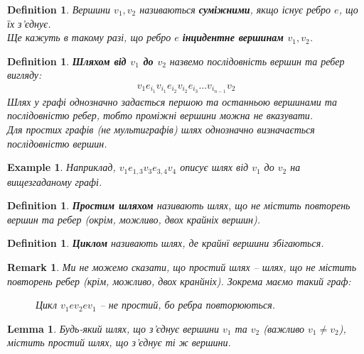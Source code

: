 \documentclass[a4paper, 14pt]{extarticle}
\theoremstyle{theoremdd}
\theoremstyle{theoremdd}
\newtheorem{definition}[theorem]{Definition}
\theoremstyle{theoremdd}
\theoremstyle{theoremdd}
\theoremstyle{theoremdd}
\newtheorem{example}[theorem]{Example}
\theoremstyle{theoremdd}
\theoremstyle{theoremdd}
\theoremstyle{theoremdd}
\theoremstyle{theoremdd}
\theoremstyle{theoremdd}
\theoremstyle{theoremdd}
\newtheorem{remark}[theorem]{Remark}
\theoremstyle{theoremdd}
\theoremstyle{theoremdd}
\newtheorem{lemma}[theorem]{Lemma}
\theoremstyle{theoremdd}
\theoremstyle{theoremdd}
\begin{document}
\begin{definition}
Вершини $v_1,v_2$ називаються \textbf{суміжними}, якщо існує ребро $e$, що їх з'єднує.\\
Ще кажуть в такому разі, що ребро $e$ \textbf{інцидентне вершинам $v_1,v_2$}. 
\end{definition}

\begin{definition}
\textbf{Шляхом від $v_1$ до $v_2$} назвемо послідовність вершин та ребер вигляду:
\begin{align*}
v_1 e_{i_1} v_{i_1} e_{i_2} v_{i_2} e_{i_3} \dots v_{i_{n-1}} v_2
\end{align*}
Шлях у графі однозначно задається першою та останньою вершинами та послідовністю ребер, тобто проміжні вершини можна не вказувати.\\
Для простих графів (не мультиграфів) шлях однозначно визначається послідовністю вершин.
\end{definition}

\begin{example}
Наприклад, $v_1 e_{1,3} v_3 e_{3,4} v_4$ описує шлях від $v_1$ до $v_2$ на вищезгаданому графі.
\end{example}

\begin{definition}
\textbf{Простим шляхом} називають шлях, що не містить повторень вершин та ребер (окрім, можливо, двох крайніх вершин).
\end{definition}

\begin{definition}
\textbf{Циклом} називають шлях, де крайнї вершини збігаються.
\end{definition}

\begin{remark}
Ми не можемо сказати, що простий шлях -- шлях, що не містить повторень ребер (крім, можливо, двох кранйніх). Зокрема маємо такий граф:
\begin{figure}[H]
\centering
{}
\caption*{Цикл $v_1ev_2ev_1$ -- не простий, бо ребра повторюються.}
\end{figure}
\end{remark}

\begin{lemma}
Будь-який шлях, що з'єднує вершини $v_1$ та $v_2$ (важливо $v_1 \neq v_2$), містить простий шлях, що з'єднує ті ж вершини.
\end{lemma}
\end{document}
